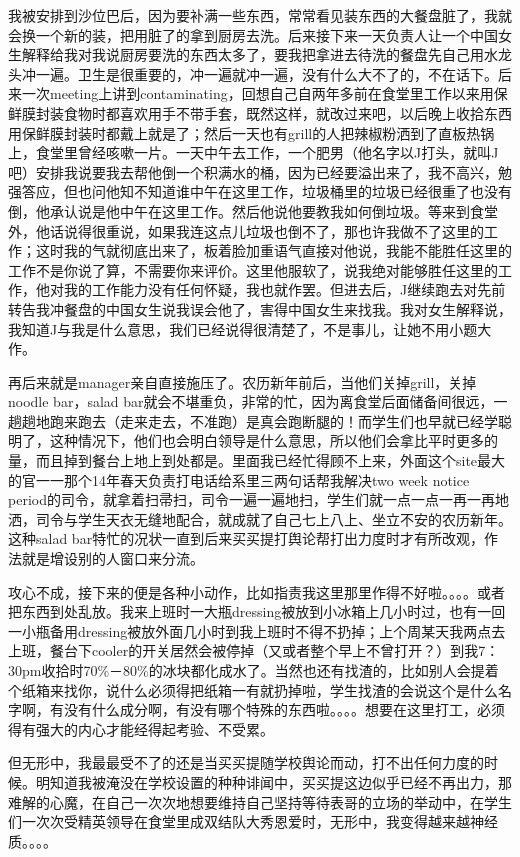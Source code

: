 \documentclass[12pt]{book}
\begin{document}
我被安排到沙位巴后，因为要补满一些东西，常常看见装东西的大餐盘脏了，我就会换一个新的装，把用脏了的拿到厨房去洗。后来接下来一天负责人让一个中国女生解释给我对我说厨房要洗的东西太多了，要我把拿进去待洗的餐盘先自己用水龙头冲一遍。卫生是很重要的，冲一遍就冲一遍，没有什么大不了的，不在话下。后来一次meeting上讲到contaminating，回想自己自两年多前在食堂里工作以来用保鲜膜封装食物时都喜欢用手不带手套，既然这样，就改过来吧，以后晚上收拾东西用保鲜膜封装时都戴上就是了；然后一天也有grill的人把辣椒粉洒到了直板热锅上，食堂里曾经咳嗽一片。一天中午去工作，一个肥男（他名字以J打头，就叫J吧）安排我说要我去帮他倒一个积满水的桶，因为已经要溢出来了，我不高兴，勉强答应，但也问他知不知道谁中午在这里工作，垃圾桶里的垃圾已经很重了也没有倒，他承认说是他中午在这里工作。然后他说他要教我如何倒垃圾。等来到食堂外，他话说得很重说，如果我连这点儿垃圾也倒不了，那也许我做不了这里的工作；这时我的气就彻底出来了，板着脸加重语气直接对他说，我能不能胜任这里的工作不是你说了算，不需要你来评价。这里他服软了，说我绝对能够胜任这里的工作，他对我的工作能力没有任何怀疑，我也就作罢。但进去后，J继续跑去对先前转告我冲餐盘的中国女生说我误会他了，害得中国女生来找我。我对女生解释说，我知道J与我是什么意思，我们已经说得很清楚了，不是事儿，让她不用小题大作。

再后来就是manager亲自直接施压了。农历新年前后，当他们关掉grill，关掉noodle bar，salad bar就会不堪重负，非常的忙，因为离食堂后面储备间很远，一趟趟地跑来跑去（走来走去，不准跑）是真会跑断腿的！而学生们也早就已经学聪明了，这种情况下，他们也会明白领导是什么意思，所以他们会拿比平时更多的量，而且掉到餐台上地上到处都是。里面我已经忙得顾不上来，外面这个site最大的官一一那个14年春天负责打电话给系里三两句话帮我解决two week notice period的司令，就拿着扫帚扫，司令一遍一遍地扫，学生们就一点一点一再一再地洒，司令与学生天衣无缝地配合，就成就了自己七上八上、坐立不安的农历新年。这种salad bar特忙的况状一直到后来买买提打舆论帮打出力度时才有所改观，作法就是增设别的人窗口来分流。

攻心不成，接下来的便是各种小动作，比如指责我这里那里作得不好啦。。。。或者把东西到处乱放。我来上班时一大瓶dressing被放到小冰箱上几小时过，也有一回一小瓶备用dressing被放外面几小时到我上班时不得不扔掉；上个周某天我两点去上班，餐台下cooler的开关居然会被停掉（又或者整个早上不曾打开？）到我7：30pm收拾时70\%－80\%的冰块都化成水了。当然也还有找渣的，比如别人会提着个纸箱来找你，说什么必须得把纸箱一有就扔掉啦，学生找渣的会说这个是什么名字啊，有没有什么成分啊，有没有哪个特殊的东西啦。。。。想要在这里打工，必须得有强大的内心才能经得起考验、不受累。

但无形中，我最最受不了的还是当买买提随学校舆论而动，打不出任何力度的时候。明知道我被淹没在学校设置的种种诽闻中，买买提这边似乎已经不再出力，那难解的心魔，在自己一次次地想要维持自己坚持等待表哥的立场的举动中，在学生们一次次受精英领导在食堂里成双结队大秀恩爱时，无形中，我变得越来越神经质。。。。
\end{document}
